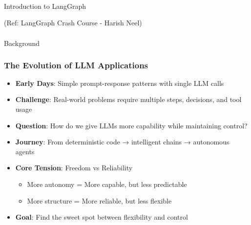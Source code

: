 \begin{frame}[fragile]\frametitle{}
\begin{center}
{\Large Introduction to LangGraph}

{\tiny (Ref: LangGraph Crash Course - Harish Neel)}
\end{center}
\end{frame}

\begin{frame}[fragile]\frametitle{}
\begin{center}
{\Large Background}
\end{center}
\end{frame}

\begin{frame}[fragile]\frametitle{The Evolution of LLM Applications}
      \begin{itemize}
        \item \textbf{Early Days}: Simple prompt-response patterns with single LLM calls
        \item \textbf{Challenge}: Real-world problems require multiple steps, decisions, and tool usage
        \item \textbf{Question}: How do we give LLMs more capability while maintaining control?
        \item \textbf{Journey}: From deterministic code → intelligent chains → autonomous agents
        \item \textbf{Core Tension}: Freedom vs Reliability
        \begin{itemize}
            \item More autonomy = More capable, but less predictable
            \item More structure = More reliable, but less flexible
        \end{itemize}
        \item \textbf{Goal}: Find the sweet spot between flexibility and control
      \end{itemize}
\end{frame}


